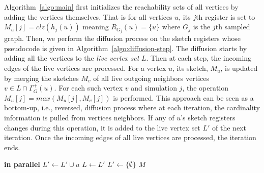  Algorithm~\ref{algo:main} first initializes the reachability sets of all vertices by adding the vertices themselves. 
 That is for all vertices $u$, its $j$th register is set to $M_u[j]=clz(h_j(u))$ meaning $R_{{G}_j}(u) = \{u\}$ where $G_j$ is the $j$th sampled graph. 
 Then, we perform the diffusion process on the sketch registers whose pseudocode is given in Algorithm~\ref{algo:diffusion-step}. The diffusion starts by adding all the vertices to the {\em live vertex set} $L$. 
 Then at each step, the incoming edges of the live vertices are processed. 
 For a vertex $u$, its sketch, $M_u$, is updated by merging the sketches $M_v$ of all live outgoing neighbors vertices $v \in {L} \cap \Gamma^+_{G}(u)$. For each such vertex $v$ and simulation $j$, the operation $M_u[j] = max(M_u[j], M_v[j])$ is performed. This approach can be seen as a bottom-up, i.e., reversed,  diffusion process where at each iteration, the cardinality information is pulled from vertices neighbors.
If any of $u$'s sketch registers changes during this operation, it is added to the live vertex set $L'$ of the next iteration. Once the incoming edges of all live vertices are processed, the iteration ends. 
 
 
\renewcommand{\baselinestretch}{0.95}
\begin{algorithm}[!ht]
\caption{($G,M,{\cal J},R_S$)}
\label{algo:diffusion-step}
\begin{algorithmic}[1]
         {\bf in parallel} \label{ln:inner_start} %
            \For{$j \in (0,{\cal J}]$} \label{ln:vec1}
                 \label{ln:early_exit}
                    \label{ln:update}          
                \EndIf
            \EndFor
                \State $L' \leftarrow L' \cup u $ \label{ln:inner_end}
            \EndIf
        \EndFor
        \EndFor
        \State $L \leftarrow L'$
        \State $L' \leftarrow \{\emptyset\}$
    \EndWhile
    \State \Return $M$
\end{algorithmic}
\end{algorithm}
\renewcommand{\baselinestretch}{1}

